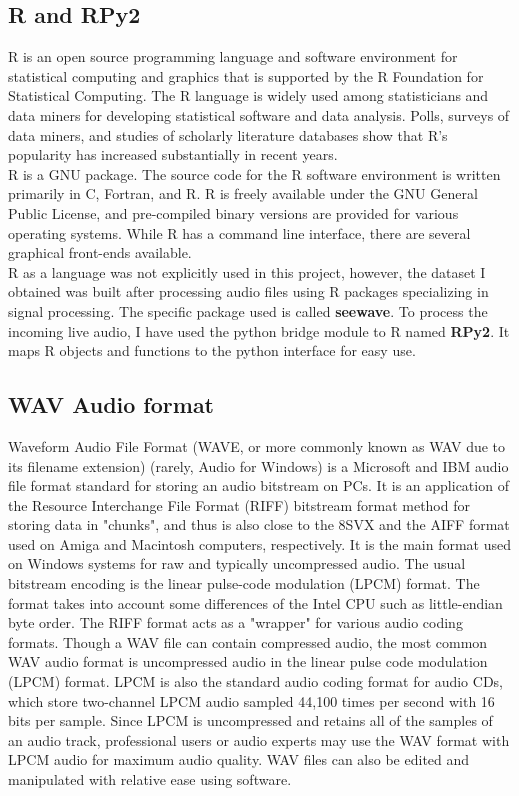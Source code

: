 \documentclass[12pt]{article}
\begin{document}
		\subsection{R and RPy2}
		R is an open source programming language and software environment for statistical computing and graphics that is supported by the R Foundation for Statistical Computing. The R language is widely used among statisticians and data miners for developing statistical software and data analysis. Polls, surveys of data miners, and studies of scholarly literature databases show that R's popularity has increased substantially in recent years.\\R is a GNU package. The source code for the R software environment is written primarily in C, Fortran, and R. R is freely available under the GNU General Public License, and pre-compiled binary versions are provided for various operating systems. While R has a command line interface, there are several graphical front-ends available.\\R as a language was not explicitly used in this project, however, the dataset I obtained was built after processing audio files using R packages specializing in signal processing. The specific package used is called \textbf{seewave}. To process the incoming live audio, I have used the python bridge module to R named \textbf{RPy2}. It maps R objects and functions to the python interface for easy use.
		
		\subsection{WAV Audio format}
		Waveform Audio File Format (WAVE, or more commonly known as WAV due to its filename extension) (rarely, Audio for Windows) is a Microsoft and IBM audio file format standard for storing an audio bitstream on PCs. It is an application of the Resource Interchange File Format (RIFF) bitstream format method for storing data in "chunks", and thus is also close to the 8SVX and the AIFF format used on Amiga and Macintosh computers, respectively. It is the main format used on Windows systems for raw and typically uncompressed audio. The usual bitstream encoding is the linear pulse-code modulation (LPCM) format.  The format takes into account some differences of the Intel CPU such as little-endian byte order. The RIFF format acts as a "wrapper" for various audio coding formats. Though a WAV file can contain compressed audio, the most common WAV audio format is uncompressed audio in the linear pulse code modulation (LPCM) format. LPCM is also the standard audio coding format for audio CDs, which store two-channel LPCM audio sampled 44,100 times per second with 16 bits per sample. Since LPCM is uncompressed and retains all of the samples of an audio track, professional users or audio experts may use the WAV format with LPCM audio for maximum audio quality. WAV files can also be edited and manipulated with relative ease using software.
		
\end{document}
